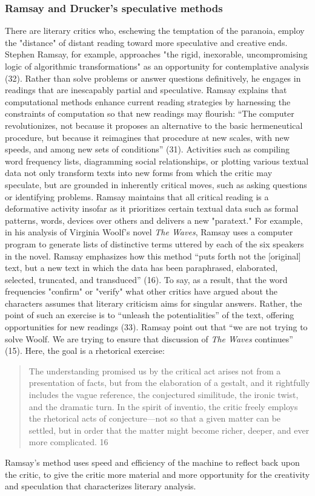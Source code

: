 \documentclass[11pt]{article}
\begin{document}
\subsubsection{Ramsay and Drucker's speculative methods}
\label{sec:org1c9610f}
There are literary critics who, eschewing the temptation of the
paranoia, employ the "distance" of distant reading toward more
speculative and creative ends. Stephen Ramsay, for example, approaches
"the rigid, inexorable, uncompromising logic of algorithmic
transformations" as an opportunity for contemplative analysis
(32). Rather than solve problems or answer questions definitively, he
engages in readings that are inescapably partial and
speculative. Ramsay explains that computational methods enhance
current reading strategies by harnessing the constraints of
computation so that new readings may flourish: “The computer
revolutionizes, not because it proposes an alternative to the basic
hermeneutical procedure, but because it reimagines that procedure at
new scales, with new speeds, and among new sets of conditions”
(31). Activities such as compiling word frequency lists, diagramming
social relationships, or plotting various textual data not only
transform texts into new forms from which the critic may speculate,
but are grounded in inherently critical moves, such as asking
questions or identifying problems. Ramsay maintains that all critical
reading is a deformative activity insofar as it prioritizes certain
textual data such as formal patterns, words, devices over others and
delivers a new "paratext." For example, in his analysis of Virginia
Woolf’s novel \emph{The Waves}, Ramsay uses a computer program to generate
lists of distinctive terms uttered by each of the six speakers in the
novel. Ramsay emphasizes how this method “puts forth not the
[original] text, but a new text in which the data has been
paraphrased, elaborated, selected, truncated, and transduced” (16). To
say, as a result, that the word frequencies "confirm" or "verify" what
other critics have argued about the characters assumes that literary
criticism aims for singular answers. Rather, the point of such an
exercise is to “unleash the potentialities” of the text, offering
opportunities for new readings (33). Ramsay point out that “we are not
trying to solve Woolf. We are trying to ensure that discussion of \emph{The
Waves} continues” (15). Here, the goal is a rhetorical exercise:
\begin{quote}
The understanding promised us by the critical act arises not from a
presentation of facts, but from the elaboration of a gestalt, and it
rightfully includes the vague reference, the conjectured similitude,
the ironic twist, and the dramatic turn. In the spirit of inventio,
the critic freely employs the rhetorical acts of conjecture—not so
that a given matter can be settled, but in order that the matter might
become richer, deeper, and ever more complicated. 16
\end{quote}
Ramsay's method uses speed and efficiency of the machine to reflect
back upon the critic, to give the critic more material and more
opportunity for the creativity and speculation that characterizes
literary analysis. 
\end{document}
